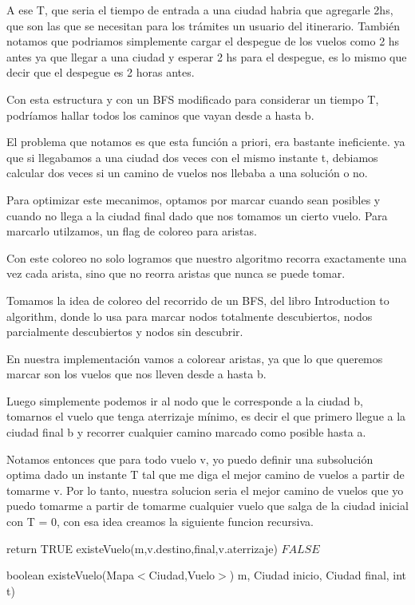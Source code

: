 A ese T, que seria el tiempo de entrada a una ciudad habria que agregarle 2hs, que son las que se necesitan para los tr\'amites un usuario del itinerario. Tambi\'en notamos que podriamos simplemente cargar el despegue de los vuelos como 2 hs antes ya que llegar a una ciudad y esperar 2 hs para el despegue, es lo mismo que decir que el despegue es 2 horas antes.

Con esta estructura y con un BFS modificado para considerar un tiempo T, podr\'iamos hallar todos los caminos que vayan desde a hasta b. 

El problema que notamos es que esta funci\'on a priori, era bastante ineficiente. ya que si llegabamos a una ciudad dos veces con el mismo instante t, debiamos calcular dos veces si un camino de vuelos nos llebaba a una soluci\'on o no.

Para optimizar este mecanimos, optamos por marcar cuando sean posibles y cuando no llega a la ciudad final dado que nos tomamos un cierto vuelo. Para marcarlo utilzamos, un flag de coloreo para aristas.

Con este coloreo no solo logramos que nuestro algoritmo recorra exactamente una vez cada arista, sino que no reorra aristas que nunca se puede tomar.

Tomamos la idea de coloreo del recorrido de un BFS, del libro Introduction to algorithm, donde lo usa para marcar nodos totalmente descubiertos, nodos parcialmente descubiertos y nodos sin descubrir.

En nuestra implementaci\'on vamos a colorear aristas, ya que lo que queremos marcar son los vuelos que nos lleven desde a hasta b.

Luego simplemente podemos ir al nodo que le corresponde a la ciudad b, tomarnos el vuelo que tenga aterrizaje m\'inimo, es decir el que primero llegue a la ciudad final b y recorrer cualquier camino marcado como posible hasta a.

Notamos entonces que para todo vuelo v, yo puedo definir una subsoluci\'on optima dado un instante T tal que me diga el mejor camino de vuelos a partir de tomarme v.
Por lo tanto, nuestra solucion seria el mejor camino de vuelos que yo puedo tomarme a partir de tomarme cualquier vuelo que salga de la ciudad inicial con T = 0, con esa idea creamos la siguiente funcion recursiva.

\begin{algorithm}[H]
\begin{algorithmic}[1]
		\STATE return TRUE
	\ENDIF
        \RETURN existeVuelo(m,v.destino,final,v.aterrizaje)
    \ENDIF
\ENDFOR
\RETURN $FALSE$
\caption{boolean existeVuelo(Mapa$<$Ciudad,Vuelo$>$) m, Ciudad inicio, Ciudad final, int t)}%
\end{algorithmic}
\end{algorithm}

